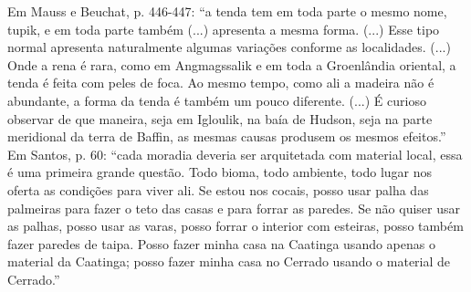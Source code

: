 Em Mauss e Beuchat, p. 446-447: \enquote{a tenda tem em toda parte o mesmo nome, tupik, e em toda parte também (...) apresenta a mesma forma. (...) Esse tipo normal apresenta naturalmente algumas variações conforme as localidades. (...) Onde a rena é rara, como em Angmagssalik e em toda a Groenlândia oriental, a tenda é feita com peles de foca. Ao mesmo tempo, como ali a madeira não é abundante, a forma da tenda é também um pouco diferente. (...) É curioso observar de que maneira, seja em Igloulik, na baía de Hudson, seja na parte meridional da terra de Baffin, as mesmas causas produsem os mesmos efeitos.}
Em Santos, p. 60: \enquote{cada moradia deveria ser arquitetada com material local, essa é uma primeira grande questão. Todo bioma, todo ambiente, todo lugar nos oferta as condições para viver ali. Se estou nos cocais, posso usar palha das palmeiras para fazer o teto das casas e para forrar as paredes. Se não quiser usar as palhas, posso usar as varas, posso forrar o interior com esteiras, posso também fazer paredes de taipa. Posso fazer minha casa na Caatinga usando apenas o material da Caatinga; posso fazer minha casa no Cerrado usando o material de Cerrado.}